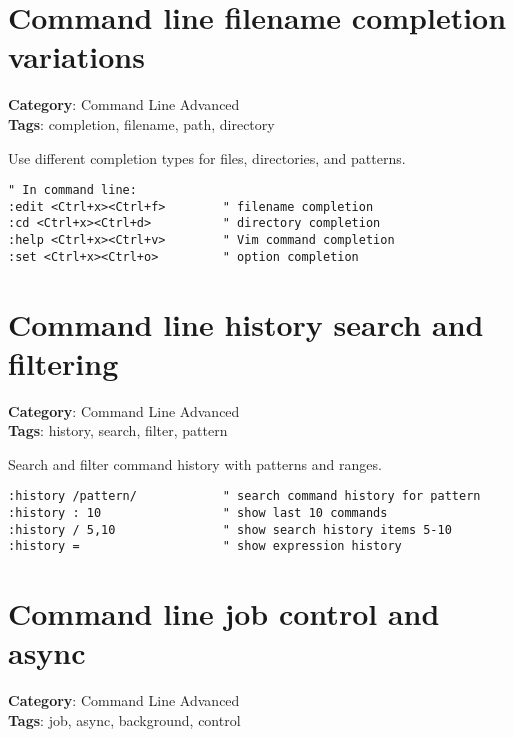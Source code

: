 {{{{\section{Command line filename completion variations}

\textbf{Category}: Command Line Advanced\\ \textbf{Tags}: completion, filename, path, directory
\vspace{0.5cm}

Use different completion types for files, directories, and patterns.

\begin{Exa*}{}
\begin{Verbatim}[fontsize=\footnotesize, breaklines, breakanywhere]
" In command line:
:edit <Ctrl+x><Ctrl+f>        " filename completion
:cd <Ctrl+x><Ctrl+d>          " directory completion  
:help <Ctrl+x><Ctrl+v>        " Vim command completion
:set <Ctrl+x><Ctrl+o>         " option completion
\end{Verbatim}
\end{Exa*}

\section{Command line history search and filtering}

\textbf{Category}: Command Line Advanced\\ \textbf{Tags}: history, search, filter, pattern
\vspace{0.5cm}

Search and filter command history with patterns and ranges.

\begin{Exa*}{}
\begin{Verbatim}[fontsize=\footnotesize, breaklines, breakanywhere]
:history /pattern/            " search command history for pattern
:history : 10                 " show last 10 commands
:history / 5,10               " show search history items 5-10
:history =                    " show expression history
\end{Verbatim}
\end{Exa*}

\section{Command line job control and async}

\textbf{Category}: Command Line Advanced\\ \textbf{Tags}: job, async, background, control
\vspace{0.5cm}

}}}}
